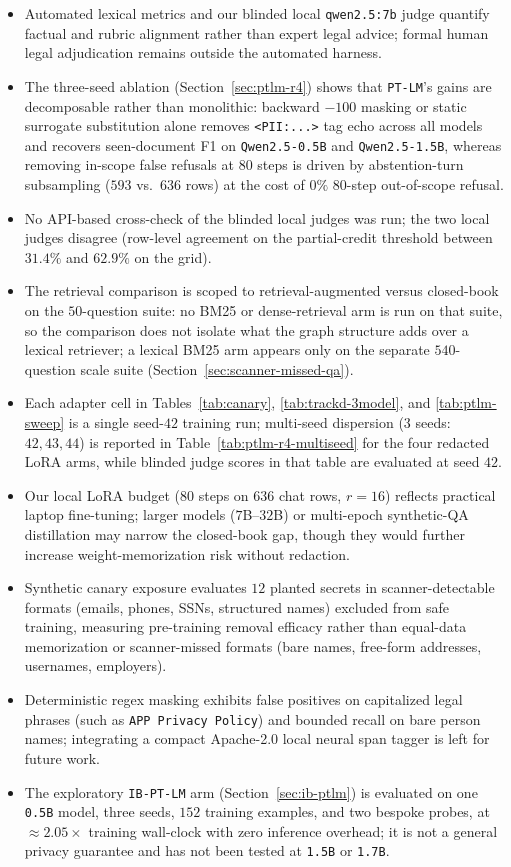 \documentclass{article}
\begin{document}
\begin{itemize}
    \item Automated lexical metrics and our blinded local \texttt{qwen2.5:7b} judge quantify factual and rubric alignment rather than expert legal advice; formal human legal adjudication remains outside the automated harness.
    \item The three-seed ablation (Section~\ref{sec:ptlm-r4}) shows that \texttt{PT-LM}'s gains are decomposable rather than monolithic: backward $-100$ masking or static surrogate substitution alone removes \texttt{<PII:...>} tag echo across all models and recovers seen-document F1 on \texttt{Qwen2.5-0.5B} and \texttt{Qwen2.5-1.5B}, whereas removing in-scope false refusals at $80$ steps is driven by abstention-turn subsampling ($593$ vs.\ $636$ rows) at the cost of $0\%$ $80$-step out-of-scope refusal.
    \item No API-based cross-check of the blinded local judges was run; the two local judges disagree (row-level agreement on the partial-credit threshold between $31.4\%$ and $62.9\%$ on the grid).
    \item The retrieval comparison is scoped to retrieval-augmented versus closed-book on the $50$-question suite: no BM25 or dense-retrieval arm is run on that suite, so the comparison does not isolate what the graph structure adds over a lexical retriever; a lexical BM25 arm appears only on the separate $540$-question scale suite (Section~\ref{sec:scanner-missed-qa}).
    \item Each adapter cell in Tables~\ref{tab:canary}, \ref{tab:trackd-3model}, and \ref{tab:ptlm-sweep} is a single seed-$42$ training run; multi-seed dispersion ($3$ seeds: $42, 43, 44$) is reported in Table~\ref{tab:ptlm-r4-multiseed} for the four redacted LoRA arms, while blinded judge scores in that table are evaluated at seed $42$.
    \item Our local LoRA budget ($80$ steps on $636$ chat rows, $r=16$) reflects practical laptop fine-tuning; larger models ($7$B--$32$B) or multi-epoch synthetic-QA distillation may narrow the closed-book gap, though they would further increase weight-memorization risk without redaction.
    \item Synthetic canary exposure evaluates $12$ planted secrets in scanner-detectable formats (emails, phones, SSNs, structured names) excluded from safe training, measuring pre-training removal efficacy rather than equal-data memorization or scanner-missed formats (bare names, free-form addresses, usernames, employers).
    \item Deterministic regex masking exhibits false positives on capitalized legal phrases (such as \texttt{APP Privacy Policy}) and bounded recall on bare person names; integrating a compact Apache-2.0 local neural span tagger is left for future work.
    \item The exploratory \texttt{IB-PT-LM} arm (Section~\ref{sec:ib-ptlm}) is evaluated on one \texttt{0.5B} model, three seeds, $152$ training examples, and two bespoke probes, at $\approx 2.05\times$ training wall-clock with zero inference overhead; it is not a general privacy guarantee and has not been tested at \texttt{1.5B} or \texttt{1.7B}.
\end{itemize}
\end{document}
